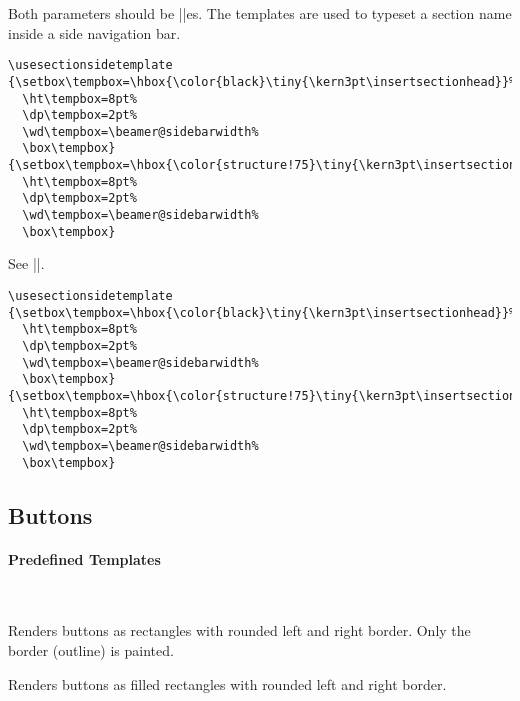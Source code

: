 \begin{command}{\usesectionsidetemplate{}}
  Both parameters should be |\hbox|es. The templates are used to
  typeset a section name inside a side navigation bar.
  \example
\begin{verbatim}
\usesectionsidetemplate
{\setbox\tempbox=\hbox{\color{black}\tiny{\kern3pt\insertsectionhead}}%
  \ht\tempbox=8pt%
  \dp\tempbox=2pt%
  \wd\tempbox=\beamer@sidebarwidth%
  \box\tempbox}
{\setbox\tempbox=\hbox{\color{structure!75}\tiny{\kern3pt\insertsectionhead}}%
  \ht\tempbox=8pt%
  \dp\tempbox=2pt%
  \wd\tempbox=\beamer@sidebarwidth%
  \box\tempbox}
\end{verbatim}
\end{command}



\begin{command}{\usesubsectionsidetemplate{}}
  See |\usesectionsidetemplate|.
  \example
\begin{verbatim}
\usesectionsidetemplate
{\setbox\tempbox=\hbox{\color{black}\tiny{\kern3pt\insertsectionhead}}%
  \ht\tempbox=8pt%
  \dp\tempbox=2pt%
  \wd\tempbox=\beamer@sidebarwidth%
  \box\tempbox}
{\setbox\tempbox=\hbox{\color{structure!75}\tiny{\kern3pt\insertsectionhead}}%
  \ht\tempbox=8pt%
  \dp\tempbox=2pt%
  \wd\tempbox=\beamer@sidebarwidth%
  \box\tempbox}
\end{verbatim}
\end{command}










\subsection{Buttons}
\label{section-navigation-buttons}

\paragraph{Predefined Templates}\ 

\begin{command}{\beamertemplateoutlinebuttons}
  Renders buttons as rectangles with rounded left and right
  border. Only the border (outline) is painted.
\end{command}

\begin{command}{\beamertemplatesolidbuttons}
  Renders buttons as filled rectangles with rounded left and right
  border.
\end{command}


